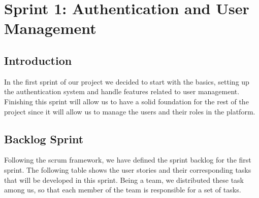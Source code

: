 \chapter{Sprint 1: Authentication and User Management}
\section{Introduction}
In the first sprint of our project we decided to start with the basics, setting up the authentication system and
handle features related to user management. Finishing this sprint will allow us to have a solid foundation for the
rest of the project since it will allow us to manage the users and their roles in the platform.

\section{Backlog Sprint}
Following the scrum framework, we have defined the sprint backlog for the first sprint.
The following table shows the user stories and their corresponding tasks that will be developed in this sprint.
Being a team, we distributed these task among us, so that each member of the team is responsible for a set of tasks.

